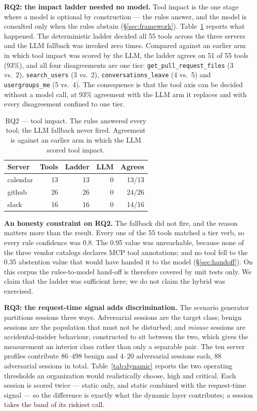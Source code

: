 \textbf{RQ2: the impact ladder needed no model.} Tool impact is the one stage
where a model is optional by construction --- the rules answer, and the model is
consulted only when the rules abstain (\S\ref{sec:framework}).
Table~\ref{tab:impact} reports what happened. The deterministic ladder decided
all 55 tools across the three servers and the LLM fallback was invoked zero
times. Compared against an earlier arm in which tool impact was scored by the
LLM, the ladder agrees on 51 of 55 tools (93\%), and all four disagreements are
one tier: \texttt{get\_pull\_request\_files} (3 vs.\ 2), \texttt{search\_users}
(3 vs.\ 2), \texttt{conversations\_leave} (4 vs.\ 5) and \texttt{usergroups\_me}
(5 vs.\ 4). The consequence is that the tool axis can be decided without a model
call, at 93\% agreement with the LLM arm it replaces and with every
disagreement confined to one tier.

\begin{table}[t]
  \centering
  \small
  \caption{RQ2 --- tool impact. The rules answered every tool; the LLM fallback
    never fired. Agreement is against an earlier arm in which the LLM scored
    tool impact.}
  \label{tab:impact}
  \begin{tabular}{lrrrr}
    \toprule
    Server & Tools & Ladder & LLM & Agrees \\
    \midrule
    calendar & 13 & 13 & 0 & 13/13 \\
    github   & 26 & 26 & 0 & 24/26 \\
    slack    & 16 & 16 & 0 & 14/16 \\
    \bottomrule
  \end{tabular}
\end{table}

\textbf{An honesty constraint on RQ2.} The fallback did not fire, and the reason
matters more than the result. Every one of the 55 tools matched a tier verb, so
every rule confidence was 0.8. The 0.95 value was unreachable, because none of
the three vendor catalogs declares MCP tool annotations; and no tool fell to the
0.35 abstention value that would have handed it to the model
(\S\ref{sec:handoff}). On this corpus the rules-to-model hand-off is therefore
covered by unit tests only. We claim that the ladder was sufficient here; we do
not claim the hybrid was exercised.

\textbf{RQ3: the request-time signal adds discrimination.} The scenario
generator partitions sessions three ways. Adversarial sessions are the target
class; benign sessions are the population that must not be disturbed; and
\emph{misuse} sessions are accidental-insider behaviour, constructed to sit
between the two, which gives the measurement an interior class rather than only
a separable pair. The ten server profiles contribute 86--498 benign and 4--20
adversarial sessions each, 88 adversarial sessions in total.
Table~\ref{tab:dynamic} reports the two operating thresholds an organization
would realistically choose, high and critical. Each session is scored twice ---
static only, and static combined with the request-time signal --- so the
difference is exactly what the dynamic layer contributes; a session takes the
band of its riskiest call.

